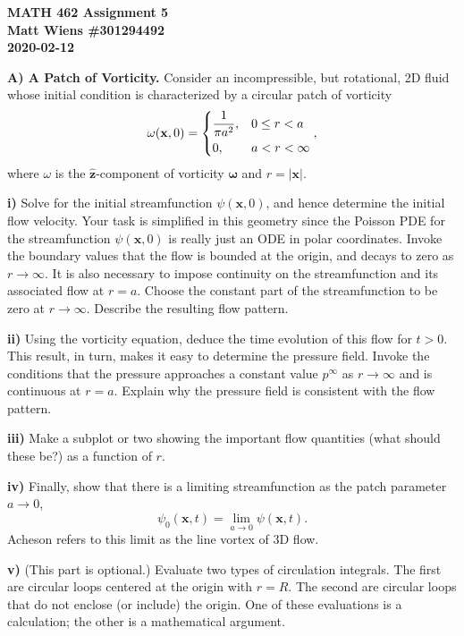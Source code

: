 \documentclass{article}
\def\*#1{\mathbf{#1}}
\newcommand{\zhat}{\mathbf{\hat{z}}}
\newcommand{\omegavec}{\boldsymbol{\omega}}
\begin{document}
\textbf{MATH 462 Assignment 5} \\
\textbf{Matt Wiens \#301294492} \\
\textbf{2020-02-12}

\textbf{A) A Patch of Vorticity.}
Consider an incompressible, but rotational, 2D fluid whose initial
condition is characterized by a circular patch of vorticity
%
\begin{equation*}
    \omega(\*x, 0) =
        \begin{dcases}
            \frac{1}{\pi a^2},& 0 \leq r < a \\
            0,& a < r < \infty
        \end{dcases}
        ,
\end{equation*}
%
where $\omega$ is the $\zhat$-component of vorticity $\omegavec$ and $r
= |\*x|$.

\textbf{i)} Solve for the initial streamfunction $\psi(\*x, 0)$, and
hence determine the initial flow velocity. Your task is simplified in
this geometry since the Poisson PDE for the streamfunction $\psi(\*x,
0)$ is really just an ODE in polar coordinates. Invoke the boundary
values that the flow is bounded at the origin, and decays to zero as $r
\to \infty$. It is also necessary to impose continuity on the
streamfunction and its associated flow at $r = a$. Choose the constant
part of the streamfunction to be zero at $r \to \infty$. Describe the
resulting flow pattern.

\textbf{ii)} Using the vorticity equation, deduce the time evolution of
this flow for $t > 0$. This result, in turn, makes it easy to determine
the pressure field. Invoke the conditions that the pressure approaches a
constant value $p^\infty$ as $r \to \infty$ and is continuous at $r =
a$. Explain why the pressure field is consistent with the flow pattern.

\textbf{iii)} Make a subplot or two showing the important flow
quantities (what should these be?) as a function of $r$.

\textbf{iv)} Finally, show that there is a limiting streamfunction as the patch
parameter $a \to 0$,
%
\begin{equation*}
    \psi_0(\*x, t) = \lim_{a \to 0} \psi(\*x, t)
    .
\end{equation*}
%
Acheson refers to this limit as the line vortex of 3D flow.

\textbf{v)} (This part is optional.) Evaluate two types of circulation
integrals. The first are circular loops centered at the origin with $r =
R$. The second are circular loops that do not enclose (or include) the
origin. One of these evaluations is a calculation; the other is a
mathematical argument.
\end{document}

